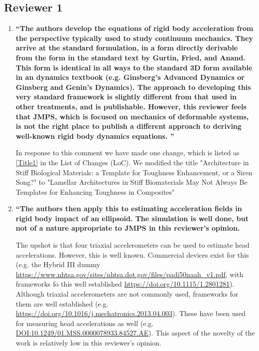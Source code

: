 \documentclass[11pt,letterpaper]{report}
\begin{document}
\subsection*{Reviewer 1}
\begin{enumerate}[label=\textit{1.\arabic*},wide, labelwidth=!, labelindent=0pt]

\item \label{e1c1} {\bf ``The authors develop the equations of rigid body acceleration from the perspective typically used to study continuum mechanics. They arrive at the standard formulation, in a form directly derivable from the form in the standard text by Gurtin, Fried, and Anand. This form is identical in all ways to the standard 3D form available in an dynamics textbook (e.g. Ginsberg's Advanced Dynamics or Ginsberg and Genin's Dynamics). The approach to developing this very standard framework is slightly different from that used in other treatments, and is publishable. However, this reviewer feels that JMPS, which is focused on mechanics of deformable systems, is not the right place to publish a different approach to deriving well-known rigid body dynamics equations.
''}

In response to this comment we have made one change, which is listed as \ref{Title1} in the List of Changes (LoC). We modified the title "Architecture in Stiff Biological Materials: a Template for Toughness Enhancement, or a Siren Song?" to "Lamellar Architectures in Stiff Biomaterials May Not Always Be Templates for Enhancing Toughness in Composites"

\item \label{e1c2} {\bf ``The authors then apply this to estimating acceleration fields in rigid body impact of an ellipsoid.  The simulation is well done, but not of a nature appropriate to JMPS in this reviewer's opinion.

The upshot is that four triaxial accelerometers can be used to estimate head accelerations. However, this is well known.  Commercial devices exist for this (e.g. the Hybrid III dummy \url{https://www.nhtsa.gov/sites/nhtsa.dot.gov/files/padi50naah_v1.pdf}, with frameworks fo this well established \url{https://doi.org/10.1115/1.2801281}). Although triaxial accelerometers are not commonly used, frameworks for them are well established (e.g. \url{https://doi.org/10.1016/j.mechatronics.2013.04.003}).  These have been used for measuring head accelerations as well (e.g. \url{DOI:10.1249/01.MSS.0000078933.84527.AE}). This aspect of the novelty of the work is relatively low in this reviewer's opinion.

}
\end{enumerate}
\end{document}
